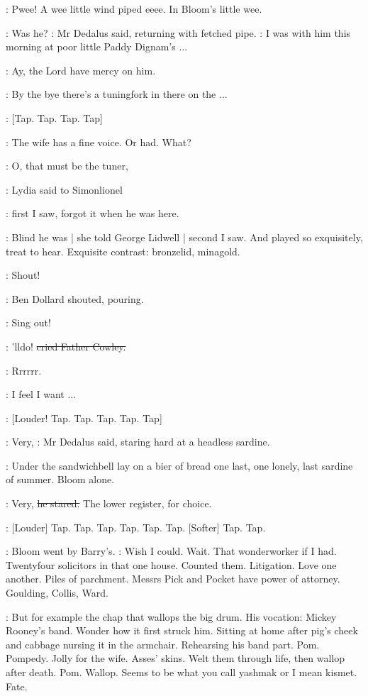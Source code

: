 :
Pwee!
A wee little wind piped eeee.
In Bloom's little wee.

\simon:
Was he?
:
Mr Dedalus said,
returning with fetched pipe.
\simon:
I was with him this morning at poor little Paddy Dignam's ...

\cowley:
Ay,
the Lord have mercy on him.

\simon:
By the bye there's a tuningfork in there on the ...

\stripling:
[Tap.
Tap.
Tap.
Tap]

\lidwell:
The wife has a fine voice.
Or had.
What?

\MissD:
O,
that must be the tuner,

:
Lydia said to Simonlionel

\MissD:
first I saw,
forgot it when he was here.

:
Blind he was |
she told George Lidwell |
second I saw.
And played so exquisitely,
treat to hear.
Exquisite contrast:
bronzelid,
minagold.

\dollard:
Shout!

:
Ben Dollard shouted,
pouring.

\dollard:
Sing out!

\cowley:
'lldo!
\sout{cried Father Cowley.}

:
Rrrrrr.

\BloomInt:
I feel I want ...

\stripling:
[Louder!
Tap.
Tap.
Tap.
Tap.
Tap]

\simon:
Very,
:
Mr Dedalus said,
staring hard at a headless sardine.

:
Under the sandwichbell
lay on a bier of bread one last,
one lonely,
last
sardine of summer.
Bloom alone.

\simon:
Very,
\sout{he stared.}
The lower register,
for choice.

\stripling:
[Louder] Tap.
Tap.
Tap.
Tap.
Tap.
Tap.
[Softer] Tap.
Tap.

:
Bloom went by Barry's.
\BloomInt:
Wish I could.
Wait.
That wonderworker if I
had.
Twentyfour solicitors in that one house.
Counted them.
Litigation.
Love one another.
Piles of parchment.
Messrs Pick and Pocket have power
of attorney.
Goulding,
Collis,
Ward.

\BloomInt:
But for example the chap that wallops the big drum.
His vocation:
Mickey Rooney's band.
Wonder how it first struck him.
Sitting at home
after pig's cheek and cabbage nursing it in the armchair.
Rehearsing his
band part.
Pom.
Pompedy.
Jolly for the wife.
Asses' skins.
Welt them
through life,
then wallop after death.
Pom.
Wallop.
Seems to be what you
call yashmak or I mean kismet.
Fate.

